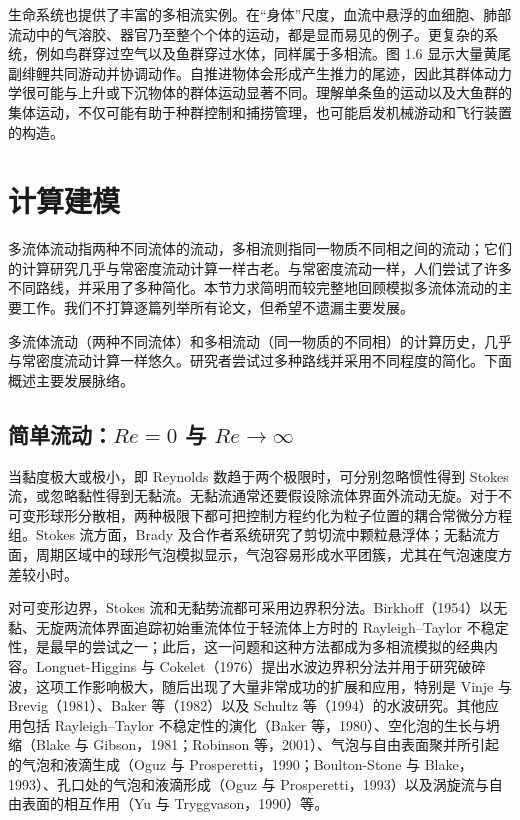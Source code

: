 \documentclass[11pt,a4paper,openany,fontset=none]{ctexbook}
\newenvironment{sourceblock}
  {\par\addvspace{0.65\baselineskip}\noindent\begin{minipage}{\linewidth}\centering}
  {\end{minipage}\par\addvspace{0.48\baselineskip}}
\begin{document}
\begin{sourceblock}
\end{sourceblock}

生命系统也提供了丰富的多相流实例。在“身体”尺度，血流中悬浮的血细胞、肺部流动中的气溶胶、器官乃至整个个体的运动，都是显而易见的例子。更复杂的系统，例如鸟群穿过空气以及鱼群穿过水体，同样属于多相流。图 1.6 显示大量黄尾副绯鲤共同游动并协调动作。自推进物体会形成产生推力的尾迹，因此其群体动力学很可能与上升或下沉物体的群体运动显著不同。理解单条鱼的运动以及大鱼群的集体运动，不仅可能有助于种群控制和捕捞管理，也可能启发机械游动和飞行装置的构造。

\begin{sourceblock}
\end{sourceblock}

\section{计算建模}

多流体流动指两种不同流体的流动，多相流则指同一物质不同相之间的流动；它们的计算研究几乎与常密度流动计算一样古老。与常密度流动一样，人们尝试了许多不同路线，并采用了多种简化。本节力求简明而较完整地回顾模拟多流体流动的主要工作。我们不打算逐篇列举所有论文，但希望不遗漏主要发展。

多流体流动（两种不同流体）和多相流动（同一物质的不同相）的计算历史，几乎与常密度流动计算一样悠久。研究者尝试过多种路线并采用不同程度的简化。下面概述主要发展脉络。

\subsection{\texorpdfstring{简单流动：$Re=0$ 与 $Re\to\infty$}{简单流动：Re=0 与 Re 趋于无穷}}


当黏度极大或极小，即 Reynolds 数趋于两个极限时，可分别忽略惯性得到 Stokes 流，或忽略黏性得到无黏流。无黏流通常还要假设除流体界面外流动无旋。对于不可变形球形分散相，两种极限下都可把控制方程约化为粒子位置的耦合常微分方程组。Stokes 流方面，Brady 及合作者系统研究了剪切流中颗粒悬浮体；无黏流方面，周期区域中的球形气泡模拟显示，气泡容易形成水平团簇，尤其在气泡速度方差较小时。

对可变形边界，Stokes 流和无黏势流都可采用边界积分法。Birkhoff（1954）以无黏、无旋两流体界面追踪初始重流体位于轻流体上方时的 Rayleigh--Taylor 不稳定性，是最早的尝试之一；此后，这一问题和这种方法都成为多相流模拟的经典内容。Longuet-Higgins 与 Cokelet（1976）提出水波边界积分法并用于研究破碎波，这项工作影响极大，随后出现了大量非常成功的扩展和应用，特别是 Vinje 与 Brevig（1981）、Baker 等（1982）以及 Schultz 等（1994）的水波研究。其他应用包括 Rayleigh--Taylor 不稳定性的演化（Baker 等，1980）、空化泡的生长与坍缩（Blake 与 Gibson，1981；Robinson 等，2001）、气泡与自由表面聚并所引起的气泡和液滴生成（Oguz 与 Prosperetti，1990；Boulton-Stone 与 Blake，1993）、孔口处的气泡和液滴形成（Oguz 与 Prosperetti，1993）以及涡旋流与自由表面的相互作用（Yu 与 Tryggvason，1990）等。
\end{document}
